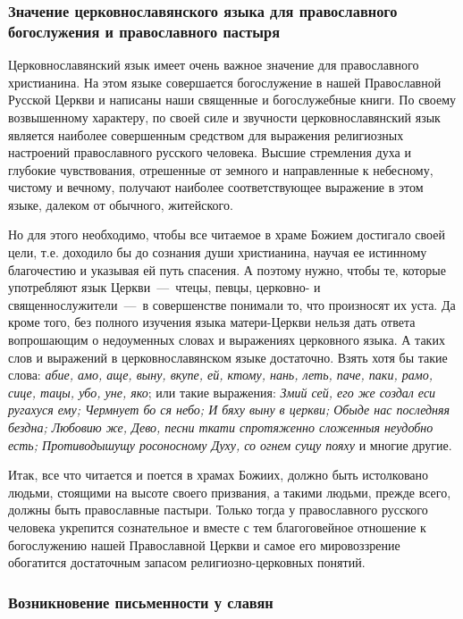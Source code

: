 \documentclass[11pt,a4paper,oneside]{memoir}
\begin{document}
                \subsubsection[Значение церковнославянского языка]{Значение церковнославянского языка для православного богослужения и православного пастыря}
                
    Церковнославянский язык имеет очень важное значение для православного христианина. На этом языке совершается богослужение в нашей Православной Русской Церкви и написаны наши священные и богослужебные книги. По своему возвышенному характеру, по своей силе и звучности церковнославянский язык является наиболее совершенным средством для выражения религиозных настроений православного русского человека. Высшие стремления духа и глубокие чувствования, отрешенные от земного и направленные к небесному, чистому и вечному, получают наиболее соответствующее выражение в этом языке, далеком от обычного, житейского.
    
    Но для этого необходимо, чтобы все читаемое в храме Божием достигало своей цели, т.е. доходило бы до сознания души христианина, научая ее истинному благочестию и указывая ей путь спасения. А поэтому нужно, чтобы те, которые употребляют язык Церкви~---~чтецы, певцы, церковно- и священнослужители~---~в совершенстве понимали то, что произносят их уста. Да кроме того, без полного изучения языка матери-Церкви нельзя дать ответа вопрошающим о недоуменных словах и выражениях церковного языка. А таких слов и выражений в церковнославянском языке достаточно. Взять хотя бы такие слова: \emph{абие, амо, аще, выну, вкупе, ей, ктому, нань, леть, паче, паки, рамо, сице, тацы, убо, уне, яко}; или такие выражения: \emph{Змий сей, его же создал еси ругахуся ему; Чермнует бо ся небо; И бяху выну в церкви; Обыде нас последняя бездна; Любовию же, Дево, песни ткати спротяженно сложенныя неудобно есть; Противодышущу росоносному Духу, со огнем сущу пояху} и многие другие.
    
    Итак, все что читается и поется в храмах Божиих, должно быть истолковано людьми, стоящими на высоте своего призвания, а такими людьми, прежде всего, должны быть православные пастыри. Только тогда у православного русского человека укрепится сознательное и вместе с тем благоговейное отношение к богослужению нашей Православной Церкви и самое его мировоззрение обогатится достаточным запасом религиозно-церковных понятий.
    
                \subsubsection{Возникновение письменности у славян}
                
\end{document}
